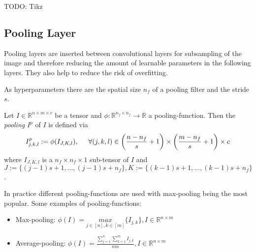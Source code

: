 \documentclass[a4paper, 12pt]{scrreprt} %
\begin{document}
TODO:
Tikz



\subsection{Pooling Layer}
\label{subsec:PL}
Pooling layers are inserted between convolutional layers for subsampling of the image and therefore reducing the amount of learnable parameters in the following layers. They also help to reduce the risk of overfitting.

As hyperparameters there are the spatial size $n_f$ of a pooling filter and the stride $s$.

\begin{definition}[Pooling]
Let $I \in \mathbb{R}^{n\times m \times c}$  be a tensor and $\phi : \mathbb{R}^{n_f \times n_f} \to \mathbb{R}$ a pooling-function. Then the \emph{pooling} $I^p$ of $I$ is defined via
\begin{equation*}
I^p_{j,k,l}:=\phi(I_{J,K,l}), \hspace{0.5cm} \forall (j,k,l) \in \left(\frac{n-n_f}{s}+1\right) \times \left(\frac{m-n_f}{s}+1\right) \times c
\end{equation*}
where $I_{J,K,l}$ is a $n_f \times n_f \times 1$ sub-tensor of $I$ and $J:=\{(j-1)s+1,\dots,(j-1)s+n_f\}, K:=\{(k-1)s+1,\dots,(k-1)s+n_f\}$.
\end{definition}


In practice different pooling-functions are used with max-pooling being the most popular. Some examples of pooling-functions:
\begin{itemize}
	\item Max-pooling: $\phi(I) = \underset{j \in [n],k \in [m]}{max}\{I_{j,k}\}, I\in \mathbb{R}^{n\times m}$ 
	\item Average-pooling: $\phi(I) = \frac{\sum\limits_{j=1}^{n}\sum\limits_{k=1}^{m}{I_{j,k}}}{nm}, I\in \mathbb{R}^{n\times m}$
\end{itemize}
\end{document}
